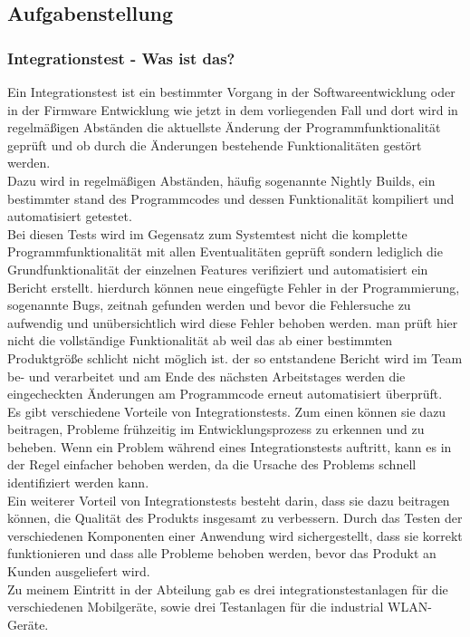 \subsection{Aufgabenstellung}
\subsubsection{Integrationstest - Was ist das?}
Ein Integrationstest ist ein bestimmter Vorgang in der Softwareentwicklung oder in der Firmware Entwicklung wie jetzt in dem vorliegenden Fall und dort wird in regelmäßigen Abständen die aktuellste Änderung der Programmfunktionalität geprüft und ob durch die Änderungen bestehende Funktionalitäten gestört werden.  \\ 
Dazu wird in regelmäßigen Abständen, häufig sogenannte Nightly Builds,  ein bestimmter stand des Programmcodes und dessen Funktionalität kompiliert und automatisiert getestet. \\ 
Bei diesen Tests wird im Gegensatz zum Systemtest nicht die komplette Programmfunktionalität mit allen Eventualitäten geprüft sondern lediglich die Grundfunktionalität der einzelnen Features verifiziert und automatisiert ein Bericht erstellt. hierdurch können neue eingefügte Fehler in der Programmierung, sogenannte Bugs, zeitnah gefunden werden und bevor die Fehlersuche zu aufwendig und unübersichtlich wird diese Fehler behoben werden. man prüft hier nicht die vollständige Funktionalität ab weil das ab einer bestimmten Produktgröße schlicht nicht möglich ist. der so entstandene Bericht wird im Team be- und verarbeitet und am Ende des nächsten Arbeitstages werden die eingecheckten Änderungen am Programmcode erneut automatisiert überprüft.
 \\ Es gibt verschiedene Vorteile von Integrationstests. Zum einen können sie dazu beitragen, Probleme frühzeitig im Entwicklungsprozess zu erkennen und zu beheben. Wenn ein Problem während eines Integrationstests auftritt, kann es in der Regel einfacher behoben werden, da die Ursache des Problems schnell identifiziert werden kann.
\\
Ein weiterer Vorteil von Integrationstests besteht darin, dass sie dazu beitragen können, die Qualität des Produkts insgesamt zu verbessern. Durch das Testen der verschiedenen Komponenten einer Anwendung wird sichergestellt, dass sie korrekt funktionieren und dass alle Probleme behoben werden, bevor das Produkt an Kunden ausgeliefert wird.
\\
Zu meinem Eintritt in der Abteilung gab es drei  integrationstestanlagen für die verschiedenen Mobilgeräte, sowie drei Testanlagen für die industrial WLAN-Geräte.
